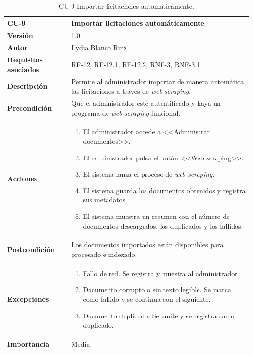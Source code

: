 \begin{table}[p]
	\centering
	\begin{tabularx}{\linewidth}{ p{} p{} }
		\toprule
		\textbf{CU-9}    & \textbf{Importar licitaciones automáticamente}\\
		\toprule
		\textbf{Versión}              & 1.0    \\
		\textbf{Autor}                & Lydia Blanco Ruiz \\
		\textbf{Requisitos asociados} & RF-12, RF-12.1, RF-12.2, RNF-3, RNF-3.1\\
		\textbf{Descripción}          & Permite al administrador importar de manera automática las licitaciones a través de \textit{web scraping}. \\
		\textbf{Precondición}         & Que el administrador esté autentificado y haya un programa de \textit{web scraping} funcional. \\
		\textbf{Acciones}             &
		\begin{enumerate}
			\def\labelenumi{\arabic{enumi}.}
			\tightlist
			\item El administrador accede a <<Administrar documentos>>.
			\item El administrador pulsa el botón <<Web scraping>>.
			\item El sistema lanza el proceso de \textit{web scraping}.
			\item El sistema guarda los documentos obtenidos y registra sus metadatos.
			\item El sistema muestra un resumen con el  número de documentos descargados, los duplicados y los fallidos.
		\end{enumerate}\\
		\textbf{Postcondición}        & Los documentos importados están disponibles para procesado e indexado. \\
		\textbf{Excepciones}          & 
		\begin{enumerate}
			\def\labelenumi{\arabic{enumi}.}
			\tightlist
			\item Fallo de red. Se registra y muestra al administrador.
			\item Documento corrupto o sin texto legible. Se marca como fallido y se continua con el siguiente.
			\item Documento duplicado. Se omite y se registra como duplicado.
		\end{enumerate}\\
		\textbf{Importancia}          & Media  \\
		\bottomrule
	\end{tabularx}
	\caption{CU-9 Importar licitaciones automáticamente.}
\end{table}


